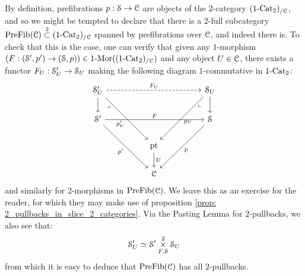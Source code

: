             \begin{remark}
                By definition, prefibrations $p: \S \to \C$ are objects of the $2$-category $(1\-\Cat_2)_{/\C}$, and so we might be tempted to declare that there is a $2$-full subcategory $\Pre\Fib(\C) \overset{2}{\subset} (1\-\Cat_2)_{/\C}$ spanned by prefibrations over $\C$, and indeed there is. To check that this is the case, one can verify that given any $1$-morphism $(F: (\S', p') \to (\S, p)) \in 1\-\Mor((1\-\Cat_2)_{/\C})$ and any object $U \in \C$, there exists a functor $F_U: \S'_U \to \S_U$ making the following diagram $1$-commutative in $1\-\Cat_2$:
                    $$
                        \begin{tikzcd}
                        	{\S'_U} &&&& {\S_U} \\
                        	{\S'} &&&& \S \\
                        	&& \pt \\
                        	&& \C
                        	\arrow["{p'}"', from=2-1, to=4-3]
                        	\arrow["U", from=3-3, to=4-3]
                        	\arrow["{p'_U}"', from=1-1, to=3-3]
                        	\arrow["\lrcorner"{anchor=center, pos=0.125}, draw=none, from=1-1, to=4-3]
                        	\arrow[from=1-1, to=2-1]
                        	\arrow["{p_U}", from=1-5, to=3-3]
                        	\arrow[from=1-5, to=2-5]
                        	\arrow["p", from=2-5, to=4-3]
                        	\arrow["F", from=2-1, to=2-5]
                        	\arrow["{F_U}", from=1-1, to=1-5, dashed]
                        	\arrow["\lrcorner"{anchor=center, pos=0.125, rotate=-90}, draw=none, from=1-5, to=4-3]
                        \end{tikzcd}
                    $$
                and similarly for $2$-morphisms in $\Pre\Fib(\C)$. We leave this as an exercise for the reader, for which they may make use of proposition \ref{prop: 2_pullbacks_in_slice_2_categories}. Via the Pasting Lemma for $2$-pullbacks, we also see that:
                    $$\S'_U \cong \S' \x^2_{F, \S} \S_U$$
                from which it is easy to deduce that $\Pre\Fib(\C)$ has all $2$-pullbacks.
            \end{remark}
        
